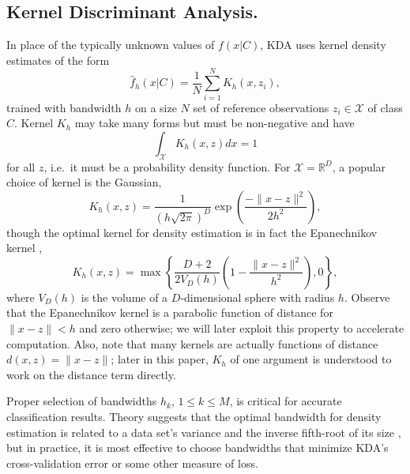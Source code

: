 \documentclass[twoside,leqno,twocolumn]{article}
\begin{document}
\subsection{Kernel Discriminant Analysis.}
In place of the typically unknown values of $f(x|C)$, KDA uses kernel
density estimates of the form
\begin{equation}
  \widehat{f}_h(x|C) = \frac{1}{N} \sum_{i=1}^N K_h(x,z_i) ,
\end{equation}
trained with bandwidth $h$ on a size $N$ set of reference observations
$z_i \in \mathcal{X}$ of class $C$.  Kernel $K_h$ may take many forms
but must be non-negative and have
\begin{equation}
  \int_{\mathcal{X}} K_h(x,z) dx = 1
\end{equation}
for all $z$, i.e.~it must be a probability density function.  For
$\mathcal{X} = \mathbb{R}^D$, a popular choice of kernel is the
Gaussian,
\begin{equation}
  K_h(x,z) = \frac{1}{\left( h \sqrt{2 \pi} \right)^D} \exp \! \left( \frac{- \| x - z \|^2}{2 h^2} \right) ,
\end{equation}
though the optimal kernel for density estimation is in fact the
Epanechnikov kernel \cite{silverman86},
\begin{equation}
  K_h(x,z) = \max \left\{ \frac{D + 2}{2 V_D(h)} \left( 1 - \frac{\| x - z \|^2}{h^2} \right), 0 \right\} ,
\end{equation}
where $V_D(h)$ is the volume of a $D$-dimensional sphere with radius
$h$.  Observe that the Epanechnikov kernel is a parabolic function of
distance for $\| x - z \| < h$ and zero otherwise; we will later
exploit this property to accelerate computation.  Also, note that many
kernels are actually functions of distance $d(x,z) = \| x - z \|$;
later in this paper, $K_h$ of one argument is understood to work on
the distance term directly.

Proper selection of bandwidths $h_k$, $1 \leq k \leq M$, is critical
for accurate classification results.  Theory suggests that the optimal
bandwidth for density estimation is related to a data set's variance
and the inverse fifth-root of its size \cite{silverman86},
but in practice, it is most effective to choose bandwidths that
minimize KDA's cross-validation error or some other measure of loss.
\end{document}
